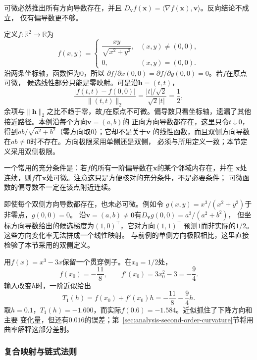 可微必然推出所有方向导数存在，并且 $D_{\bm{v}}f(\bm{x})=\langle\nabla f(\bm{x}),\bm{v}\rangle$。反向结论不成立， 仅有偏导数更不够。
\begin{example}[偏导数存在但不可微]
\label{ex:analysis-partials-not-differentiable}
定义$f:\mathbb{R}^2\to\mathbb{R}$为
\[   f(x,y)=
\begin{cases}     \dfrac{xy}{\sqrt{x^2+y^2}}, & (x,y)\neq(0,0),\\[6pt]     0, & (x,y)=(0,0).
\end{cases} \]
沿两条坐标轴，函数恒为$0$，所以 $\partial f/\partial x(0,0)=\partial f/\partial y(0,0)=0$。若$f$在原点可微， 候选线性部分只能是零映射。可是沿$\bm{h}=(t,t)$，
\[   \frac{|f(t,t)-f(0,0)|}{\lVert(t,t)\rVert_2}   =   \frac{|t|/\sqrt{2}}{\sqrt{2}|t|}   =\frac12, \]
余项与$\lVert\bm{h}\rVert_2$之比不趋于零，故$f$在原点不可微。偏导数只看坐标轴，遗漏了其他接近路径。本例沿每个方向$\bm v=(a,b)$的
正向方向导数都存在，这里只令$t\downarrow0$，得到$ab/\sqrt{a^2+b^2}$（零方向取$0$）；它却不是关于$\bm v$
的线性函数，而且双侧方向导数在$ab\neq0$时不存在。方向极限采用单侧还是双侧，
必须与所用定义一致；本节定义采用双侧极限。
\end{example}

一个常用的充分条件是：若$f$的所有一阶偏导数在$\bm{x}$的某个邻域内存在，并在 $\bm{x}$处连续，则$f$在$\bm{x}$处可微。注意这只是方便核对的充分条件，不是必要条件； 可微函数的偏导数不一定在该点附近连续。

即使每个双侧方向导数都存在，也未必可微。例如令
$g(x,y)=x^3/(x^2+y^2)$于非零点，$g(0,0)=0$。
沿$\bm v=(a,b)\neq\bm0$有$D_{\bm v}g(0,0)=a^3/(a^2+b^2)$，
但坐标方向导数给出的候选梯度为$(1,0)^\top$，它对方向$(1,1)^\top$
预测$1$而非实际的$1/2$。这些方向变化率无法拼成一个线性映射。
与前例的单侧方向极限相比，这里直接检验了本节采用的双侧定义。

用$f(x)=x^3-3x$保留一个贯穿例子。在$x_0=1/2$处，
\[
  f(x_0)=-\frac{11}{8},\qquad f'(x_0)=3x_0^2-3=-\frac94.
\]
输入改变$h$时，一阶近似给出
\begin{equation}
  T_1(h)=f(x_0)+f'(x_0)h=-\frac{11}{8}-\frac94h.
\label{eq:analysis-cubic-linear-model}
\end{equation}
取$h=0.1$，$T_1(h)=-1.600$，而实际$f(0.6)=-1.584$。近似抓住了下降方向和主要
变化量，但还有$0.016$的误差；第~\ref{sec:analysis-second-order-curvature}节将用曲率解释这部分差别。
\subsubsection{复合映射与链式法则}

